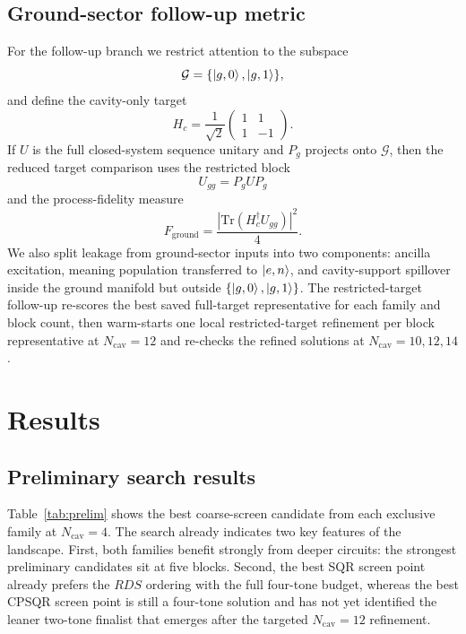 ﻿\documentclass[aps,pra,twocolumn,reprint,amsmath,amssymb,floatfix]{revtex4-2}
\begin{document}
\subsection{Ground-sector follow-up metric}

For the follow-up branch we restrict attention to the subspace
\begin{equation}
\mathcal{G} = \{\ket{g,0},\ket{g,1}\},
\end{equation}
and define the cavity-only target
\begin{equation}
H_c = \frac{1}{\sqrt{2}}
\begin{pmatrix}
1 & 1 \\
1 & -1
\end{pmatrix}.
\end{equation}
If $U$ is the full closed-system sequence unitary and $P_g$ projects onto
\(\mathcal{G}\), then the reduced target comparison uses the restricted block
\begin{equation}
U_{gg} = P_g U P_g
\end{equation}
and the process-fidelity measure
\begin{equation}
F_{\mathrm{ground}} = \frac{|\mathrm{Tr}(H_c^{\dagger} U_{gg})|^2}{4}.
\end{equation}
We also split leakage from ground-sector inputs into two components: ancilla
excitation, meaning population transferred to \(\ket{e,n}\), and cavity-support
spillover inside the ground manifold but outside \(\{\ket{g,0},\ket{g,1}\}\).
The restricted-target follow-up re-scores the best saved full-target
representative for each family and block count, then warm-starts one local
restricted-target refinement per block representative at
\(N_{\mathrm{cav}}=12\) and re-checks the refined solutions at
\(N_{\mathrm{cav}}=10,12,14\).

\section{Results}

\subsection{Preliminary search results}

Table~\ref{tab:prelim} shows the best coarse-screen candidate from each
exclusive family at $N_{\mathrm{cav}}=4$. The search already indicates two key
features of the landscape. First, both families benefit strongly from deeper
circuits: the strongest preliminary candidates sit at five blocks. Second, the
best SQR screen point already prefers the $RDS$ ordering with the full
four-tone budget, whereas the best CPSQR screen point is still a four-tone
solution and has not yet identified the leaner two-tone finalist that emerges
after the targeted $N_{\mathrm{cav}}=12$ refinement.
\end{document}
